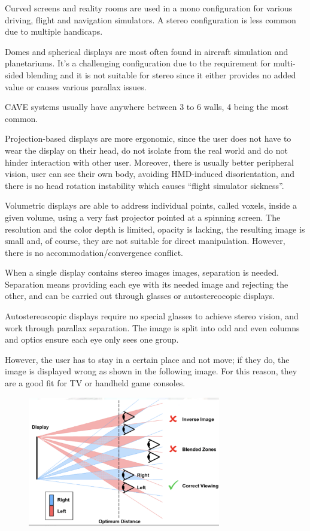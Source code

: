 \documentclass[a4paper]{article}
\begin{document}
Curved screens and reality rooms are used in a mono configuration for
various driving, flight and navigation simulators.
A stereo
configuration is less common due to multiple handicaps.

Domes and spherical displays are most often found in aircraft simulation
and planetariums.
It's a challenging configuration due to the
requirement for multi-sided blending and it is not suitable for stereo
since it either provides no added value or causes various parallax
issues.

CAVE systems usually have anywhere between 3 to 6 walls, 4 being the
most common.

Projection-based displays are more ergonomic, since the user does not
have to wear the display on their head, do not isolate from the real
world and do not hinder interaction with other user.
Moreover, there is
usually better peripheral vision, user can see their own body, avoiding
HMD-induced disorientation, and there is no head rotation instability
which causes ``flight simulator sickness''.

Volumetric displays are able to address individual points, called
voxels, inside a given volume, using a very fast projector pointed at a
spinning screen.
The resolution and the color depth is limited, opacity
is lacking, the resulting image is small and, of course, they are not
suitable for direct manipulation.
However, there is no
accommodation/convergence conflict.

When a single display contains stereo images images, separation is
needed.
Separation means providing each eye with its needed image and
rejecting the other, and can be carried out through glasses or
autostereocopic displays.

Autostereoscopic displays require no special glasses to achieve stereo
vision, and work through parallax separation.
The image is split into
odd and even columns and optics ensure each eye only sees one group.

However, the user has to stay in a certain place and not move; if they
do, the image is displayed wrong as shown in the following image.
For
this reason, they are a good fit for TV or handheld game consoles.

\begin{figure}
\centering
\includegraphics[width=0.75\textwidth]{autostereoscopic-issues}
\end{figure}
\end{document}
